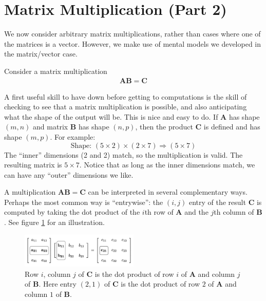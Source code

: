 \section{Matrix Multiplication (Part 2)}\label{matrixMultiplication}


We now consider arbitrary matrix multiplications, rather than cases where one of the matrices is a vector. However, we make use of mental models we developed in the matrix/vector case.

Consider a matrix multiplication 
\begin{align*}
\mathbf{A}\mathbf{B} = \mathbf{C}
\end{align*}

A first useful skill to have down before getting to computations is the skill of checking to see that a matrix multiplication is possible, and also anticipating what the shape of the output will be. This is nice and easy to do. If $\mathbf{A}$ has shape $(m, n)$ and matrix $\mathbf{B}$ has shape $(n, p)$, then the product $\mathbf{C}$ is defined and has shape $(m, p)$. For example: 
\[
\text{Shape: } (5 \times 2) \times (2 \times 7) \Rightarrow (5 \times 7)
\]
The ``inner'' dimensions (2 and 2) match, so the multiplication is valid. The resulting matrix is $5 \times 7$. Notice that as long as the inner dimensions match, we can have any ``outer'' dimensions we like. 

A multiplication $\mathbf{A}\mathbf{B} = \mathbf{C}$ can be interpreted in several complementary ways. Perhaps the most common way is ``entrywise'': the $(i,j)$ entry of the result $\mathbf{C}$ is computed by taking the dot product of the $i$th row of $\mathbf{A}$ and the $j$th column of $\mathbf{B}$. See figure \ref{entryWiseMatrixProduct} for an illustration. 

\begin{figure}[h]
\centering
\includegraphics[width=0.5\textwidth]{images/matrixProductEntryWise.png}
\caption[Jeff Yoshimi.]{Row $i$, column $j$ of $\mathbf{C}$ is the dot product of row $i$ of $\mathbf{A}$ and column $j$ of $\mathbf{B}$. Here entry $(2,1)$ of $\mathbf{C}$ is the dot product of row $2$ of $\mathbf{A}$ and column $1$ of $\mathbf{B}$.}
\label{entryWiseMatrixProduct}
\end{figure}

